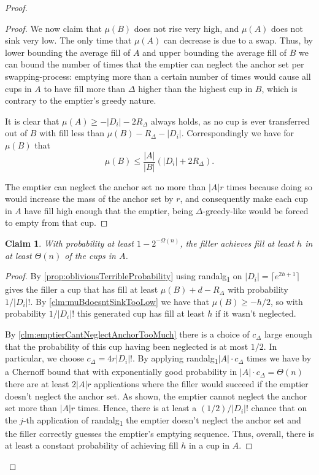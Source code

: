 \documentclass[twocolumn]{article}[10pt]
\newcommand{\randalg}{randalg\textsubscript{1}\xspace}
\newtheorem{clm}{Claim}
\begin{document}
\begin{proof}
\begin{proof}
  We now claim that $\mu(B)$ does not rise very high, and $\mu(A)$
  does not sink very low. The only time that $\mu(A)$ can
  decrease is due to a swap. Thus, by lower bounding the average
  fill of $A$ and upper bounding the average fill of $B$ we can
  bound the number of times that the emptier can neglect the
  anchor set per swapping-process: emptying more than a certain
  number of times would cause all cups in $A$ to have fill more
  than $\Delta$ higher than the highest cup in $B$, which is
  contrary to the emptier's greedy nature.

  It is clear that $\mu(A) \ge -|D_i| -2R_\Delta$ always holds,
  as no cup is ever transferred out of $B$ with fill less than
  $\mu(B) - R_\Delta -|D_i|$. Correspondingly we have for
  $\mu(B)$ that $$\mu(B) \le \frac{|A|}{|B|}(|D_i| + 2R_\Delta).$$

  The emptier can neglect the anchor set no more than $|A|r$
  times because doing so would increase the mass of the anchor
  set by $r$, and consequently make each cup in $A$ have fill
  high enough that the emptier, being $\Delta$-greedy-like would
  be forced to empty from that cup.
  
\end{proof}

\begin{clm}
With probability at least $1-2^{-\Omega(n)}$, the filler achieves fill
at least $h$ in at least $\Theta(n)$ of the cups in $A$. 
\end{clm}
\begin{proof}
  By \cref{prop:obliviousTerribleProbability} using \randalg on
  $|D_i| = \lceil e^{2h+1} \rceil$ gives the filler a cup that
  has fill at least $\mu(B) + d-R_\Delta$ with probability
  $1/|D_i|!$. By \cref{clm:muBdoesntSinkTooLow} we have that
  $\mu(B) \ge -h/2$, so with probability $1/|D_i|!$ this generated
  cup has fill at least $h$ if it wasn't neglected.

  By \cref{clm:emptierCantNeglectAnchorTooMuch} there is a choice
  of $c_\Delta$ large enough that the probability of this cup
  having been neglected is at most $1/2$. In particular, we
  choose $c_\Delta = 4r|D_i|!$. By applying \randalg $|A|\cdot
  c_\Delta$ times we have by a Chernoff bound that with
  exponentially good probability in $|A|\cdot c_\Delta =
  \Theta(n)$ there are at least $2|A|r$ applications where the
  filler would succeed if the emptier doesn't neglect the anchor
  set. As shown, the emptier cannot
  neglect the anchor set more than $|A|r$ times. Hence, there
  is at least a $(1/2)/|D_i|!$ chance that on the $j$-th
  application of \randalg the emptier doesn't neglect the anchor
  set and the filler correctly guesses the emptier's emptying
  sequence. Thus, overall, there is at least a constant
  probability of achieving fill $h$ in a cup in $A$.


\end{proof}
\end{proof}
\end{document}
